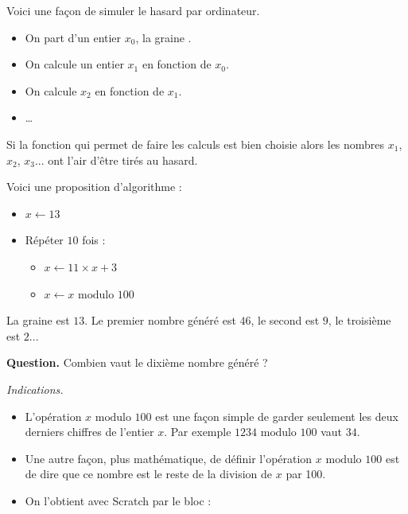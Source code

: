 \documentclass[class=report,crop=false, 12pt]{standalone}
\begin{document}
\begin{enigme}

Voici une façon de simuler le hasard par ordinateur.

\begin{itemize}
  \item On part d'un entier $x_0$, la \og graine \fg{}.
  \item On calcule un entier $x_1$ en fonction de $x_0$.
  \item On calcule $x_2$ en fonction de $x_1$.
  \item \ldots
\end{itemize}

Si la fonction qui permet de faire les calculs est bien choisie alors les nombres $x_1$, $x_2$, $x_3$... ont l'air d'être tirés au hasard.

Voici une proposition d'algorithme :
\begin{itemize}
  \item $x \leftarrow 13$
  \item Répéter $10$ fois :
  \begin{itemize}
    \item $x \leftarrow 11 \times x + 3$
    \item $x \leftarrow x \text{ modulo } 100$
  \end{itemize}
\end{itemize}  

\bigskip

La graine est $13$. Le premier nombre généré est $46$, le second est
$9$, le troisième est $2$... 

\bigskip

\textbf{Question.} Combien vaut le dixième nombre généré ?

\bigskip

\emph{Indications.}
\begin{itemize}
  \item L'opération \og $x \text{ modulo } 100$ \fg{} est une façon simple de garder seulement les deux derniers chiffres de l'entier $x$. Par exemple \og $1234 \text{ modulo } 100$  \fg{} vaut $34$.
  \item Une autre façon, plus mathématique, de définir l'opération \og $x \text{ modulo } 100$ \fg{} est de dire que ce nombre est le reste de la division de $x$ par 100.
  \item On l'obtient avec Scratch par le bloc :
\begin{center}
\end{center}  
\end{itemize}



\end{enigme}
\end{document}
